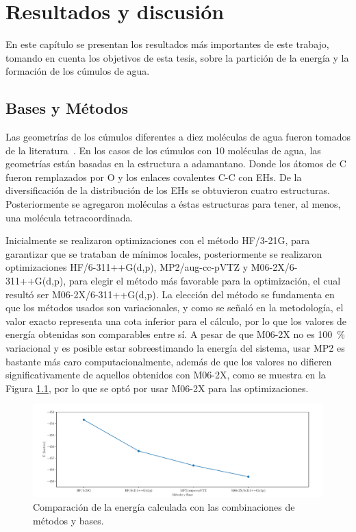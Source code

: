 \chapter{Resultados y discusión}

En este capítulo se presentan los resultados más importantes de este trabajo,
tomando en cuenta los objetivos de esta tesis, sobre la partición de la energía
y la formación de los cúmulos de agua.


\section{Bases y Métodos}

Las geometrías de los cúmulos diferentes a diez moléculas de agua fueron
tomados de la literatura~\cite{Toche2016, Yoo2010}.  En los casos de los
cúmulos con 10 moléculas de agua, las geometrías están basadas en la estructura
a adamantano. Donde los átomos de C fueron remplazados por O y los enlaces
covalentes C-C con EHs. De la diversificación de la distribución de los EHs se
obtuvieron cuatro estructuras. Posteriormente se agregaron moléculas a éstas
estructuras para tener, al menos, una molécula tetracoordinada.

Inicialmente se realizaron optimizaciones con el método HF/3-21G, para
garantizar que se trataban de mínimos locales, posteriormente se realizaron
optimizaciones HF/6-311\-+\-+\-G\-(d,\-p), MP2/aug-cc-pVTZ y
M06-2X/6-311++G(d,p), para elegir el método más favorable para la optimización,
el cual resultó ser M06-2X/6-311++G(d,p).  La elección del método se fundamenta
en que los métodos usados son variacionales, y como se señaló en la
metodología, el valor exacto representa una cota inferior para el cálculo, por
lo que los valores de energía obtenidas son comparables entre sí. A pesar de
que M06-2X no es \SI{100}{\percent} variacional y es posible estar
sobreestimando la energía del sistema, usar MP2 es bastante más caro
computacionalmente, además de que los valores no difieren significativamente de
aquellos obtenidos con M06-2X, como se muestra en la Figura \ref{HF_m062x}, por
lo que se optó por usar M06-2X para las optimizaciones.

\begin{figure}
    \centering
    \includegraphics[width=1\textwidth]{4/graf/bases_f}
    \caption{Comparación de la energía calculada con las combinaciones
de métodos y bases.}
\label{HF_m062x}
\end{figure}

